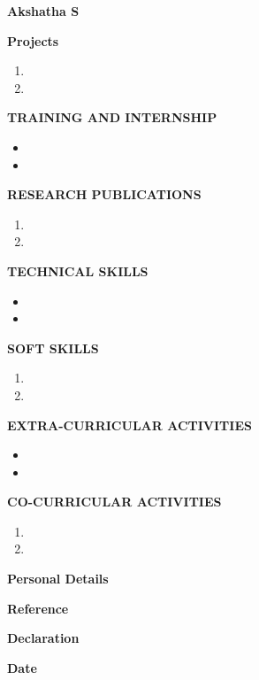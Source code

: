 \documentclass[10pt]{article}
\begin{document}
\begin{center}
\textbf{{\LARGE Akshatha S}}
\end{center}
\textbf{{\large Projects}} \begin{enumerate}
	\item 
	\item 
\end{enumerate}
\textbf{{\large TRAINING AND INTERNSHIP}} \begin{itemize}
	\item 
	\item
\end{itemize}
\textbf{{\large RESEARCH PUBLICATIONS}} \begin{enumerate}
	\item 
	\item 
\end{enumerate}
\textbf{{\large TECHNICAL SKILLS}} \begin{itemize}
	\item 
	\item
\end{itemize}
\textbf{{\large SOFT SKILLS}} \begin{enumerate}
	\item 
	\item 
\end{enumerate}
\textbf{{\large EXTRA-CURRICULAR ACTIVITIES}} \begin{itemize}
	\item 
	\item
\end{itemize}
\textbf{{\large CO-CURRICULAR ACTIVITIES}} \begin{enumerate}
	\item 
	\item 
\end{enumerate}
\begin{flushleft}
	
\textbf{{\large Personal Details}}

\textbf{{\large Reference}}

\textbf{{\large Declaration}}

\textbf{{\large Date}}
\end{flushleft}
\end{document}
